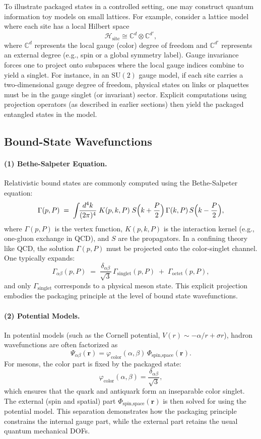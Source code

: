 \documentclass[12pt,a4paper]{article}
\begin{document}
To illustrate packaged states in a controlled setting, one may construct quantum information toy models on small lattices. For example, consider a lattice model where each site has a local Hilbert space
\[
\mathcal{H}_{\text{site}} \cong \mathbb{C}^d \otimes \mathbb{C}^{d'},
\]
where $\mathbb{C}^d$ represents the local gauge (color) degree of freedom and $\mathbb{C}^{d'}$ represents an external degree (e.g., spin or a global symmetry label). Gauge invariance forces one to project onto subspaces where the local gauge indices combine to yield a singlet.
For instance, in an $\mathrm{SU}(2)$ gauge model, if each site carries a two-dimensional gauge degree of freedom, physical states on links or plaquettes must be in the gauge singlet (or invariant) sector.
Explicit computations using projection operators (as described in earlier sections) then yield the packaged entangled states in the model.




\subsection{Bound-State Wavefunctions}


\paragraph{(1) Bethe-Salpeter Equation.}  
Relativistic bound states are commonly computed using the Bethe-Salpeter equation:
\[
\Gamma(p, P)
\;=\;
\int \!\! \frac{d^4 k}{(2\pi)^4}\;
K(p,k,P)\;
S\Bigl(k+\frac{P}{2}\Bigr)\,\Gamma(k,P)\,S\Bigl(k-\frac{P}{2}\Bigr),
\]
where $\Gamma(p,P)$ is the vertex function, $K(p,k,P)$ is the interaction kernel (e.g., one-gluon exchange in QCD), and $S$ are the propagators.
In a confining theory like QCD, the solution $\Gamma(p,P)$ must be projected onto the color-singlet channel.
One typically expands:
\[
\Gamma_{\alpha\beta}(p,P)
\;=\;
\frac{\delta_{\alpha\beta}}{\sqrt{3}}\,\Gamma_{\mathrm{singlet}}(p,P)
\;+\; \Gamma_{\mathrm{octet}}(p,P),
\]
and only $\Gamma_{\mathrm{singlet}}$ corresponds to a physical meson state.
This explicit projection embodies the packaging principle at the level of bound state wavefunctions.


\paragraph{(2) Potential Models.}  
In potential models (such as the Cornell potential, $V(r) \sim -\alpha/r + \sigma r$), hadron wavefunctions are often factorized as
\[
\Psi_{\alpha\beta}(\mathbf{r}) = \varphi_{\text{color}}(\alpha,\beta)\, \Phi_{\text{spin,space}}(\mathbf{r}).
\]
For mesons, the color part is fixed by the packaged state:
\[
\varphi_{\text{color}}(\alpha,\beta) = \frac{\delta_{\alpha\beta}}{\sqrt{3}},
\]
which ensures that the quark and antiquark form an inseparable color singlet.
The external (spin and spatial) part $\Phi_{\text{spin,space}}(\mathbf{r})$ is then solved for using the potential model.
This separation demonstrates how the packaging principle constrains the internal gauge part, while the external part retains the usual quantum mechanical DOFs.
\end{document}
